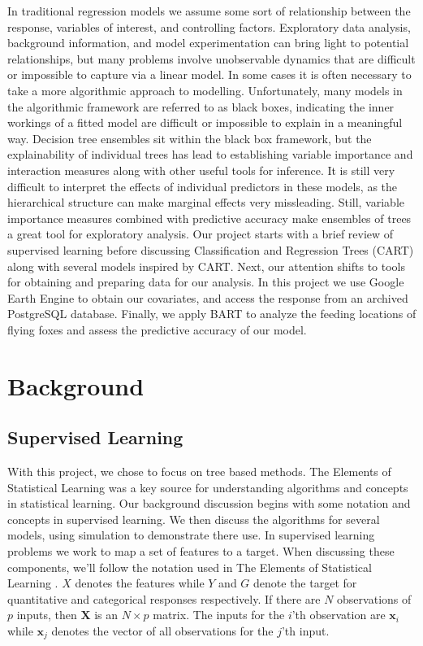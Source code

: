\documentclass[
  12pt,
  letterpaper,
  DIV=11,
  numbers=noendperiod]{scrartcl}
\newcommand{\bm}{\mathbf}
\begin{document}
In traditional regression models we assume some sort of relationship
between the response, variables of interest, and controlling factors.
Exploratory data analysis, background information, and model
experimentation can bring light to potential relationships, but many
problems involve unobservable dynamics that are difficult or impossible
to capture via a linear model. In some cases it is often necessary to
take a more algorithmic approach to modelling. Unfortunately, many
models in the algorithmic framework are referred to as black boxes,
indicating the inner workings of a fitted model are difficult or
impossible to explain in a meaningful way. Decision tree ensembles sit
within the black box framework, but the explainability of individual
trees has lead to establishing variable importance and interaction
measures along with other useful tools for inference. It is still very
difficult to interpret the effects of individual predictors in these
models, as the hierarchical structure can make marginal effects very
missleading. Still, variable importance measures combined with
predictive accuracy make ensembles of trees a great tool for exploratory
analysis. Our project starts with a brief review of supervised learning
before discussing Classification and Regression Trees (CART)
\citep{cart} along with several models inspired by CART. Next, our
attention shifts to tools for obtaining and preparing data for our
analysis. In this project we use Google Earth Engine to obtain our
covariates, and access the response from an archived PostgreSQL
database. Finally, we apply BART to analyze the feeding locations of
flying foxes and assess the predictive accuracy of our model.

\section{Background}\label{sec:background}

\subsection{Supervised Learning}\label{supervised-learning}

With this project, we chose to focus on tree based methods. The Elements
of Statistical Learning \citep{esl} was a key source for understanding
algorithms and concepts in statistical learning. Our background
discussion begins with some notation and concepts in supervised
learning. We then discuss the algorithms for several models, using
simulation to demonstrate there use. In supervised learning problems we
work to map a set of features to a target. When discussing these
components, we'll follow the notation used in The Elements of
Statistical Learning \citep{esl}. \(X\) denotes the features while \(Y\)
and \(G\) denote the target for quantitative and categorical responses
respectively. If there are \(N\) observations of \(p\) inputs, then
\(\bm X\) is an \(N\times p\) matrix. The inputs for the \(i\)'th
observation are \(\bm x_i\) while \(\bm x_j\) denotes the vector of all
observations for the \(j\)'th input.
\end{document}
